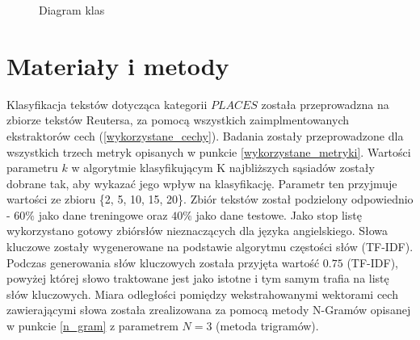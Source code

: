 \documentclass{classrep}
\begin{document}
\begin{figure}[h!]
    \centering
    \caption{Diagram klas}
    \label{fig:uml}
\end{figure}

\section{Materiały i metody} \label{mat}
Klasyfikacja tekstów dotycząca kategorii $PLACES$ została przeprowadzna na zbiorze tekstów Reutersa, za
pomocą wszystkich zaimplmentowanych ekstraktorów cech (\ref{wykorzystane_cechy}). Badania zostały
przeprowadzone dla wszystkich trzech metryk opisanych w punkcie \ref{wykorzystane_metryki}. Wartości
parametru $k$ w algorytmie klasyfikującym K najbliższych sąsiadów zostały dobrane tak, aby wykazać jego
wpływ na klasyfikację. Parametr ten przyjmuje wartości ze zbioru \{2, 5, 10, 15, 20\}. Zbiór tekstów
został podzielony odpowiednio - $60\%$ jako dane treningowe oraz $40\%$ jako dane testowe. Jako stop listę
wykorzystano gotowy zbiór\footnotemark[1] słów nieznaczących dla języka angielskiego.
Słowa kluczowe zostały wygenerowane na podstawie algorytmu częstości słów (TF-IDF). Podczas generowania
słów kluczowych została przyjęta wartość $0.75$ (TF-IDF), powyżej której słowo traktowane jest jako istotne i
tym samym trafia na listę słów kluczowych. Miara odległości pomiędzy wekstrahowanymi wektorami cech zawierającymi słowa
została zrealizowana za pomocą metody N-Gramów opisanej w punkcie \ref{n_gram} z parametrem $N=3$ (metoda trigramów).
\end{document}
